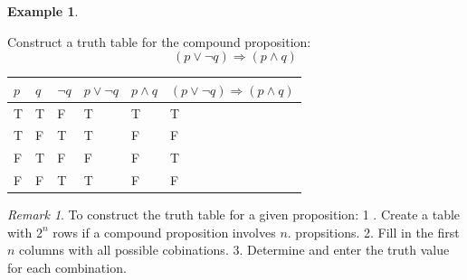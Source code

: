 \documentclass[
]{book}
\theoremstyle{definition}
\theoremstyle{definition}
\newtheorem{example}{Example}[chapter]
\theoremstyle{definition}
\theoremstyle{definition}
\theoremstyle{remark}
\newtheorem*{remark}{Remark}
\begin{document}
\begin{example}
\protect\hypertarget{exm:unnamed-chunk-32}{}\label{exm:unnamed-chunk-32}

Construct a truth table for the compound proposition:\\
\[
(p \lor \neg q) \Rightarrow (p \land q)
\]

\begin{longtable}[]{@{}
  >{\centering\arraybackslash}p{}
  >{\centering\arraybackslash}p{}
  >{\centering\arraybackslash}p{}
  >{\centering\arraybackslash}p{}
  >{\centering\arraybackslash}p{}
  >{\centering\arraybackslash}p{}@{}}
\toprule\noalign{}
\begin{minipage}[b]{\linewidth}\centering
\(p\)
\end{minipage} & \begin{minipage}[b]{\linewidth}\centering
\(q\)
\end{minipage} & \begin{minipage}[b]{\linewidth}\centering
\(\neg q\)
\end{minipage} & \begin{minipage}[b]{\linewidth}\centering
\(p \lor \neg q\)
\end{minipage} & \begin{minipage}[b]{\linewidth}\centering
\(p \land q\)
\end{minipage} & \begin{minipage}[b]{\linewidth}\centering
\((p \lor \neg q) \Rightarrow (p \land q)\)
\end{minipage} \\
\midrule\noalign{}
\endhead
\bottomrule\noalign{}
\endlastfoot
T & T & F & T & T & T \\
T & F & T & T & F & F \\
F & T & F & F & F & T \\
F & F & T & T & F & F \\
\end{longtable}

\end{example}

\begin{remark}
To construct the truth table for a given proposition:
1 . Create a table with \(2^n\) rows if a compound proposition involves \(n\).
propsitions.
2. Fill in the first \(n\) columns with all possible cobinations.
3. Determine and enter the truth value for each combination.
\end{remark}
\end{document}
